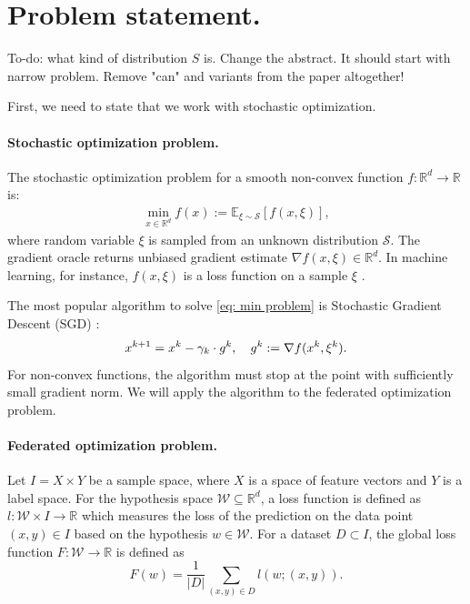 \documentclass[12pt]{article}
\newcommand{\EE}{\mathbb{E}}
\newcommand{\R}{\mathbb{R}}
\newcommand{\algname}[1]{{\sf  #1}\xspace}
\begin{document}
\section{Problem statement.}
To-do: what kind of distribution $S$ is. Change the abstract. It should start with narrow problem. Remove "can" and variants from the paper altogether!

First, we need to state that we work with stochastic optimization.
\paragraph{Stochastic optimization problem.} The stochastic optimization problem for a smooth non-convex function $f:\R^d \to \R$ is:
\begin{eqnarray}
    \min\limits_{x \in \R^d} f(x) := \EE_{\xi \sim \mathcal{S}} [f(x, \xi)],\label{eq: min problem}
\end{eqnarray}
where random variable $\xi$ is sampled from an unknown distribution $\mathcal{S}.$ The gradient oracle returns unbiased gradient estimate $\nabla f (x, \xi) \in \R^d$. In machine learning, for instance, $f(x, \xi)$ is a loss function on a sample $\xi$ \parencite{ShalevShwartz2014}.

The most popular algorithm to solve \eqref{eq: min problem} is Stochastic Gradient Descent (\algname{SGD}) 
 \parencite{Robbins1951}:
\begin{equation}
    x^{k+1} = x^k - \gamma_k \cdot  g^k, \quad g^k := \nabla f (x^k, \xi^k). \notag \label{eq: sgd intro}
\end{equation}
For non-convex functions, the algorithm must stop at the point with sufficiently small gradient norm.
We will apply the algorithm to the federated optimization problem.

\paragraph{Federated optimization problem.}
Let $I = X \times Y$ be a sample space, where $X$ is a space of feature vectors and $Y$ is a label space. For the hypothesis space $\mathcal{W} \subseteq \R^d$, a loss function is defined as $l: \mathcal{W}\times I \rightarrow \R$ which measures the loss of the prediction on the data point $(x,y) \in I$ based on the hypothesis $w \in \mathcal{W}$. For a dataset $D \subset I$, the global loss function $F:\mathcal{W}\to \R$ is defined as
\begin{equation}
F(w) = \frac{1}{|D|}\sum_{(x,y)\in D}l(w;(x,y)).
\end{equation}
\end{document}
